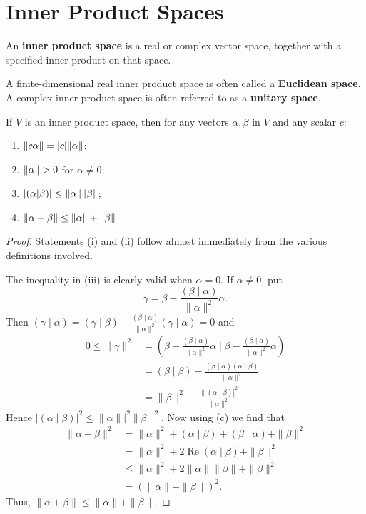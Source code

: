 \documentclass[main.tex]{subfiles}
\begin{document}
\section{Inner Product Spaces}
\begin{definition}
    An \textbf{inner product space} is a real or complex vector space, together with a specified inner product on that space. 
    
    A finite-dimensional real inner product space is often called a \textbf{Euclidean space}. A complex inner product space is often referred to as a \textbf{unitary space}.
\end{definition}

\begin{theorem}
    If $V$ is an inner product space, then for any vectors $\alpha, \beta$ in $V$ and any scalar $c$:
    \begin{enumerate}
        \item $\norm{c \alpha} = |c| \norm{\alpha}$;
        \item $\norm{\alpha} > 0$ for $\alpha \neq 0$;
        \item $|(\alpha|\beta)| \leq \norm{\alpha} \norm{\beta}$;
        \item $\norm{\alpha + \beta} \leq \norm{\alpha} + \norm{\beta}$.
    \end{enumerate}
\end{theorem}
\begin{proof}
Statements (i) and (ii) follow almost immediately from the various definitions involved. 
    
The inequality in (iii) is clearly valid when $\alpha=0$. If $\alpha \neq 0$, put
$$
\gamma=\beta-\frac{(\beta \mid \alpha)}{\|\alpha\|^2} \alpha .
$$
Then $(\gamma \mid \alpha)=(\gamma \mid \beta) - \frac{(\beta \mid \alpha)}{\|\alpha\|^2} (\gamma \mid \alpha) = 0$ and
$$
\begin{aligned}
0 \leq\|\gamma\|^2 & =\left(\beta-\frac{(\beta \mid \alpha)}{\|\alpha\|^2} \alpha \mid \beta-\frac{(\beta \mid \alpha)}{\|\alpha\|^2} \alpha\right) \\
& =(\beta \mid \beta)-\frac{(\beta \mid \alpha)(\alpha \mid \beta)}{\|\alpha\|^2} \\
& =\|\beta\|^2-\frac{\|\left.(\alpha \mid \beta)\right|^2}{\|\alpha\|^2}
\end{aligned}
$$
Hence $|(\alpha \mid \beta)|^2 \leq\left.\|\alpha\|\right|^2\|\beta\|^2$. 
Now using (c) we find that
$$
\begin{aligned}
\|\alpha+\beta\|^2 & =\|\alpha\|^2+(\alpha \mid \beta)+(\beta \mid \alpha)+\|\beta\|^2 \\
& =\|\alpha\|^2+2 \operatorname{Re}(\alpha \mid \beta)+\|\beta\|^2 \\
& \leq\|\alpha\|^2+2\|\alpha\|\|\beta\|+\|\beta\|^2 \\
& =(\|\alpha\|+\|\beta\|)^2 .
\end{aligned}
$$
Thus, $\|\alpha+\beta\| \leq\|\alpha\|+\|\beta\|$.
\end{proof}
\end{document}
